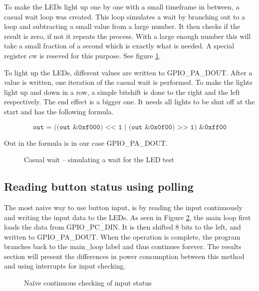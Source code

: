 To make the LEDs light up one by one with a small timeframe in between, a casual wait loop was created. This loop simulates a wait by branching out to a loop and subtracting a small value from a large number. It then checks if the result is zero, if not it repeats the process. With a large enough number this will take a small fraction of a second which is exactly what is needed. A special register cw is reseved for this purpose. See figure \ref{code:casual_wait}.

To light up the LEDs, different values are written to GPIO\_PA\_DOUT. After a value is written, one iteration of the casual wait is performed. To make the lights light up and down in a row, a simple bitshift is done to the right and the left respectively. The end effect is a bigger one. It needs all lights to be shut off at the start and has the following formula.

$$ \texttt{out = ((out \& 0xf000) << 1 | (out \& 0x0f00) >> 1) \& 0xff00} $$

Out in the formula is in our case GPIO\_PA\_DOUT.


\begin{figure}[h!]
\caption{Casual wait – simulating a wait for the LED test}
\label{code:casual_wait}
\end{figure}

\subsection{Reading button status using polling}
\label{subsec:polling}

The most naive way to use button input, is by reading the input continuously and writing the input data to the LEDs.
As seen in Figure \ref{code:polling}, the main loop first loads the data from GPIO\_PC\_DIN.
It is then shifted 8 bits to the left, and written to GPIO\_PA\_DOUT.
When the operation is complete, the program branches back to the main\_loop label and thus continues forever.
The results section will present the differences in power consumption between this method and using interrupts for input checking.

\begin{figure}[h!]
\caption{Naïve continuous checking of input status}
\label{code:polling}
\end{figure}

